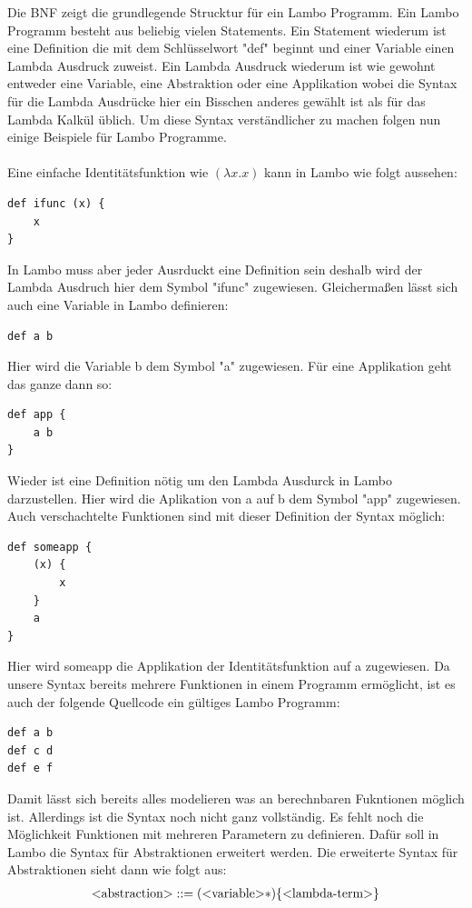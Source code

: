 \documentclass[ngerman]{article}
\newcommand{\doublelinebreak}{\par\vspace{\baselineskip}}
\begin{document}
Die BNF zeigt die grundlegende Strucktur für ein Lambo Programm. Ein Lambo Programm besteht aus beliebig vielen Statements. Ein Statement wiederum ist eine Definition die mit dem Schlüsselwort "def" beginnt und einer Variable einen Lambda Ausdruck zuweist. Ein Lambda Ausdruck wiederum ist wie gewohnt entweder eine Variable, eine Abstraktion oder eine Applikation wobei die Syntax für die Lambda Ausdrücke hier ein Bisschen anderes gewählt ist als für das Lambda Kalkül üblich. Um diese Syntax verständlicher zu machen folgen nun einige Beispiele für Lambo Programme. \\ \\
Eine einfache Identitätsfunktion wie $(\lambda x.x)$ kann in Lambo wie folgt aussehen:
\begin{lstlisting}
def ifunc (x) {
    x
}
\end{lstlisting}
In Lambo muss aber jeder Ausrduckt eine Definition sein deshalb wird der Lambda Ausdruch hier dem Symbol "ifunc" zugewiesen. Gleichermaßen lässt sich auch eine Variable in Lambo definieren:
\begin{lstlisting}
def a b
\end{lstlisting}
Hier wird die Variable b dem Symbol "a" zugewiesen. Für eine Applikation geht das ganze dann so:
\begin{lstlisting}
def app {
    a b
}
\end{lstlisting}
Wieder ist eine Definition nötig um den Lambda Ausdurck in Lambo darzustellen. Hier wird die Aplikation von a auf b dem Symbol "app" zugewiesen. Auch verschachtelte Funktionen sind mit dieser Definition der Syntax möglich:
\begin{lstlisting}
def someapp {
    (x) {
        x
    }
    a
}
\end{lstlisting}
Hier wird someapp die Applikation der Identitätsfunktion auf a zugewiesen. 
Da unsere Syntax bereits mehrere Funktionen in einem Programm ermöglicht, ist es auch der folgende Quellcode ein gültiges Lambo Programm:
\begin{lstlisting}
def a b
def c d
def e f
\end{lstlisting}
\doublelinebreak
Damit lässt sich bereits alles modelieren was an berechnbaren Fukntionen möglich ist. Allerdings ist die Syntax noch nicht ganz vollständig. Es fehlt noch die Möglichkeit Funktionen mit mehreren Parametern zu definieren. Dafür soll in Lambo die Syntax für Abstraktionen erweitert werden. Die erweiterte Syntax für Abstraktionen sieht dann wie folgt aus:
\begin{align*}
    \text{\textless abstraction\textgreater} & ::= (\text{\textless variable\textgreater}*)\{\text{\textless lambda-term\textgreater}\}\\
\end{align*}
\end{document}
